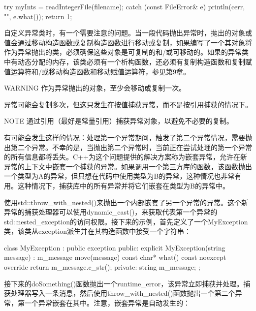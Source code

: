 \begin{cpp}
try {
    myInts = readIntegerFile(filename);
} catch (const FileError& e) {
    println(cerr, "{}", e.what());
    return 1;
}
\end{cpp}

自定义异常类时，有一个需要注意的问题。当一段代码抛出异常时，抛出的对象或值会通过移动构造函数或复制构造函数进行移动或复制，如果编写了一个其对象将作为异常抛出的类，必须确保这些对象是可复制的和/或可移动的。如果的异常类中有动态分配的内存，该类必须有一个析构函数，还必须有复制构造函数和复制赋值运算符和/或移动构造函数和移动赋值运算符，参见第9章。

\begin{myWarning}{WARNING}
作为异常抛出的对象，至少会移动或复制一次。
\end{myWarning}

异常可能会复制多次，但这只发生在按值捕获异常，而不是按引用捕获的情况下。

\begin{myNotic}{NOTE}
通过引用（最好是常量引用）捕获异常对象，以避免不必要的复制。
\end{myNotic}


有可能会发生这样的情况：处理第一个异常期间，触发了第二个异常情况，需要抛出第二个异常。不幸的是，当抛出第二个异常时，当前正在尝试处理的第一个异常的所有信息都将丢失。C++为这个问题提供的解决方案称为嵌套异常，允许在新异常的上下文中嵌套一个捕获的异常。如果调用一个第三方库的函数，该函数抛出一个类型为A的异常，但只想在代码中使用类型为B的异常，这种情况也非常有用。这种情况下，捕获库中的所有异常并将它们嵌套在类型为B的异常中。

使用std::throw\_with\_nested()来抛出一个内部嵌套了另一个异常的异常。这个新异常的捕获处理器可以使用dynamic\_cast()，来获取代表第一个异常的std::nested\_exception的访问权限。接下来的示例，首先定义了一个MyException类，该类从exception派生并在其构造函数中接受一个字符串：

\begin{cpp}
class MyException : public exception
{
    public:
        explicit MyException(string message) : m_message { move(message) } {}
        const char* what() const noexcept override { return m_message.c_str(); }
    private:
        string m_message;
};
\end{cpp}

接下来的doSomething()函数抛出一个runtime\_error，该异常立即捕获并处理。捕获处理器写入一条消息，然后使用throw\_with\_nested()函数抛出一个第二个异常，第一个异常嵌套在其中。注意，嵌套异常是自动发生的：

